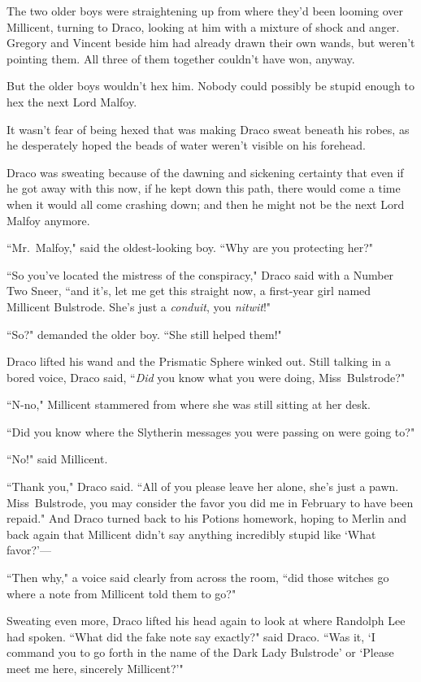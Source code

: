 The two older boys were straightening up from where they'd been looming over Millicent, turning to Draco, looking at him with a mixture of shock and anger. Gregory and Vincent beside him had already drawn their own wands, but weren't pointing them. All three of them together couldn't have won, anyway.

But the older boys wouldn't hex him. Nobody could possibly be stupid enough to hex the next Lord Malfoy.

It wasn't fear of being hexed that was making Draco sweat beneath his robes, as he desperately hoped the beads of water weren't visible on his forehead.

Draco was sweating because of the dawning and sickening certainty that even if he got away with this now, if he kept down this path, there would come a time when it would all come crashing down; and then he might not be the next Lord Malfoy anymore.

``Mr.~Malfoy," said the oldest-looking boy. ``Why are you protecting her?"

``So you've located the mistress of the conspiracy," Draco said with a Number Two Sneer, ``and it's, let me get this straight now, a first-year girl named Millicent Bulstrode. She's just a \emph{conduit}, you \emph{nitwit}!"

``So?" demanded the older boy. ``She still helped them!"

Draco lifted his wand and the Prismatic Sphere winked out. Still talking in a bored voice, Draco said, ``\emph{Did} you know what you were doing, Miss~Bulstrode?"

``N-no," Millicent stammered from where she was still sitting at her desk.

``Did you know where the Slytherin messages you were passing on were going to?"

``No!" said Millicent.

``Thank you," Draco said. ``All of you please leave her alone, she's just a pawn. Miss~Bulstrode, you may consider the favor you did me in February to have been repaid." And Draco turned back to his Potions homework, hoping to Merlin and back again that Millicent didn't say anything incredibly stupid like `What favor?'—

``Then why," a voice said clearly from across the room, ``did those witches go where a note from Millicent told them to go?"

Sweating even more, Draco lifted his head again to look at where Randolph Lee had spoken. ``What did the fake note say exactly?" said Draco. ``Was it, `I command you to go forth in the name of the Dark Lady Bulstrode' or `Please meet me here, sincerely Millicent?'"

